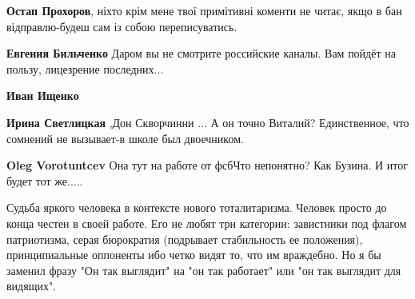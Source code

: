 \begin{itemize}
\begin{itemize}
\textbf{Остап Прохоров}, ніхто крім мене твої примітивні коменти не читає, якщо в бан відправлю-будеш сам із собою переписуватись.

 
\textbf{Евгения Бильченко} Даром вы не смотрите российские каналы. Вам пойдёт на пользу, лицезрение последних...

 
\textbf{Иван Ищенко} \Laughey[1.0][white]\Laughey[1.0][white]\Laughey[1.0][white]

 
\textbf{Ирина Светлицкая} ,Дон Скворчинни ... А он точно Виталий? Единственное, что сомнений не вызывает-в школе был двоечником.

 
\textbf{Oleg Vorotuntcev} Она тут на работе от фсбЧто непонятно? Как Бузина. И итог будет тот же.....


\end{itemize}

 

Судьба яркого человека в контексте нового тоталитаризма. Человек просто до
конца честен в своей работе. Его не любят три категории: завистники под флагом
патриотизма, серая бюрократия (подрывает стабильность ее положения),
принципиальные оппоненты ибо четко видят то, что им враждебно. Но я бы заменил
фразу "Он так выглядит" на "он так работает" или "он так выглядит для видящих".


\end{itemize}
